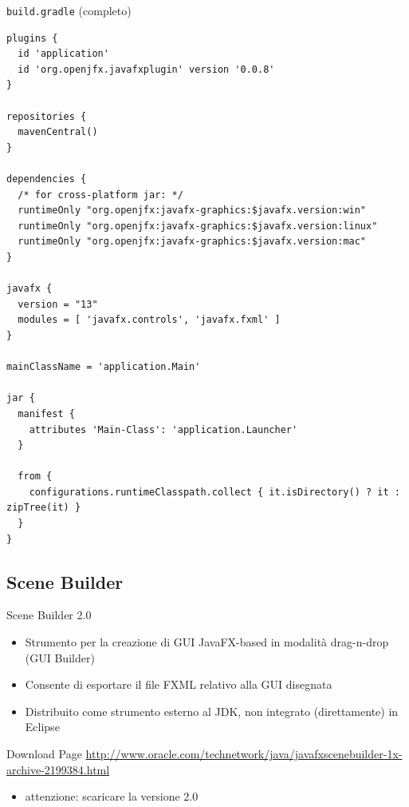\documentclass[presentation]{beamer}
\begin{document}
\begin{frame}[fragile]{\texttt{build.gradle} (completo)}
\begin{lstlisting}[basicstyle=\tiny]
plugins {
  id 'application'
  id 'org.openjfx.javafxplugin' version '0.0.8'
}

repositories {
  mavenCentral()
}

dependencies {
  /* for cross-platform jar: */
  runtimeOnly "org.openjfx:javafx-graphics:$javafx.version:win"
  runtimeOnly "org.openjfx:javafx-graphics:$javafx.version:linux"
  runtimeOnly "org.openjfx:javafx-graphics:$javafx.version:mac"
}

javafx {
  version = "13"
  modules = [ 'javafx.controls', 'javafx.fxml' ]
}

mainClassName = 'application.Main'

jar {
  manifest {
    attributes 'Main-Class': 'application.Launcher'
  }
  
  from {
    configurations.runtimeClasspath.collect { it.isDirectory() ? it : zipTree(it) }
  }
}
\end{lstlisting}
\end{frame}

\subsection{Scene Builder}

\begin{frame}{Scene Builder 2.0}
\begin{itemize}\itemsep10pt
\item Strumento per la creazione di GUI JavaFX-based in modalità drag-n-drop (GUI Builder)
\item Consente di esportare il file FXML relativo alla GUI disegnata
\item Distribuito come strumento esterno al JDK, non integrato (direttamente) in Eclipse
\end{itemize}
\begin{block}{Download Page}
\url{http://www.oracle.com/technetwork/java/javafxscenebuilder-1x-archive-2199384.html}
\begin{itemize}
\item attenzione: scaricare la versione 2.0
\end{itemize}
\end{block}
\end{frame}
\end{document}
